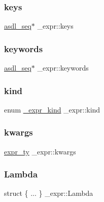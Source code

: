 \mbox{\label{struct__expr_a051be7d75dcaf30b244f0af24bfa6fdc}} 
\subsubsection{\texorpdfstring{keys}{keys}}
{\footnotesize\ttfamily \mbox{\hyperlink{structasdl__seq}{asdl\+\_\+seq}}$\ast$ \+\_\+expr\+::keys}

\mbox{\label{struct__expr_a57407aa982252ece65dece1af8041f57}} 
\subsubsection{\texorpdfstring{keywords}{keywords}}
{\footnotesize\ttfamily \mbox{\hyperlink{structasdl__seq}{asdl\+\_\+seq}}$\ast$ \+\_\+expr\+::keywords}

\mbox{\label{struct__expr_a588eb2205de8b0b03e0edd5143a26cd0}} 
\subsubsection{\texorpdfstring{kind}{kind}}
{\footnotesize\ttfamily enum \mbox{\hyperlink{_python-ast_8h_a5040779a586bc1f6938f47df869170a5}{\+\_\+expr\+\_\+kind}} \+\_\+expr\+::kind}

\mbox{\label{struct__expr_a123ee11e6d074da4cbcd6af56ef4be42}} 
\subsubsection{\texorpdfstring{kwargs}{kwargs}}
{\footnotesize\ttfamily \mbox{\hyperlink{_python-ast_8h_a56d3705e020a071405094a220c4592bd}{expr\+\_\+ty}} \+\_\+expr\+::kwargs}

\mbox{\label{struct__expr_ae44492270006e2701cf9aea94589ce07}} 
\subsubsection{\texorpdfstring{Lambda}{Lambda}}
{\footnotesize\ttfamily struct \{ ... \}   \+\_\+expr\+::\+Lambda}

